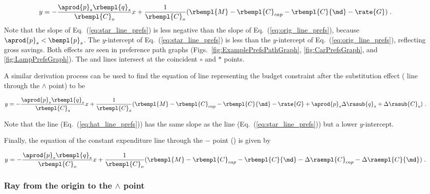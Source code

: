 \begin{equation} \label{eq:star_line_prefs}
  y = - \frac{\aprod{p}_s \rbempl{q}_s}{\rbempl{C}_o} x
         + \frac{1}{\rbempl{C}_o} (\rbempl{M} - \rbempl{C}_{cap} - \rbempl{C}{\md} - \rate{G}) \; .
\end{equation}
%
Note that the slope of Eq.~(\ref{eq:star_line_prefs}) is less negative
than the slope of Eq.~(\ref{eq:orig_line_prefs}), 
because $\aprod{p}_s < \bempl{p}_s$.
The $y$-intercept of Eq.~(\ref{eq:star_line_prefs}) is less than the 
$y$-intercept of Eq.~(\ref{eq:orig_line_prefs}),
reflecting gross savings.
Both effects are seen in
preference path graphs 
(Figs.~\ref{fig:ExamplePrefsPathGraph}, \ref{fig:CarPrefsGraph}, and \ref{fig:LampPrefsGraph}).
The \circcirc{} and \starstar{} lines intersect at the coincident $\circ$ and $*$ points.

A similar derivation process can be used to find the equation of 
line representing the budget constraint
after the substitution effect (\hathat{} line through the $\wedge$ point) to be

\begin{equation} \label{eq:hat_line_prefs}
  y = - \frac{\aprod{p}_s \rbempl{q}_s}{\rbempl{C}_o} x
         + \frac{1}{\rbempl{C}_o} (\rbempl{M} - \rbempl{C}_{cap} - \rbempl{C}{\md} 
                                   - \rate{G} + \aprod{p}_s \Delta \rasub{q}_s + \Delta \rasub{C}_o) \; .
\end{equation}

Note that the \hathat{} line (Eq.~(\ref{eq:hat_line_prefs})) has the same slope as 
the \starstar{} line (Eq.~(\ref{eq:star_line_prefs}))
but a lower $y$-intercept.

Finally, the equation of the constant expenditure line through the 
$-$ point (\barbar{}) is given by

\begin{equation} \label{eq:bar_line_prefs}
  y = - \frac{\aprod{p}_s \rbempl{q}_s}{\rbempl{C}_o} x
        + \frac{1}{\rbempl{C}_o} (\rbempl{M} - \rbempl{C}_{cap} - \rbempl{C}{\md} 
                                   - \Delta \raempl{C}_{cap} - \Delta \raempl{C}{\md}) \; .
\end{equation}


\subsubsection{Ray from the origin to the $\wedge$ point} 
\label{sec:pref_graph_ray}

